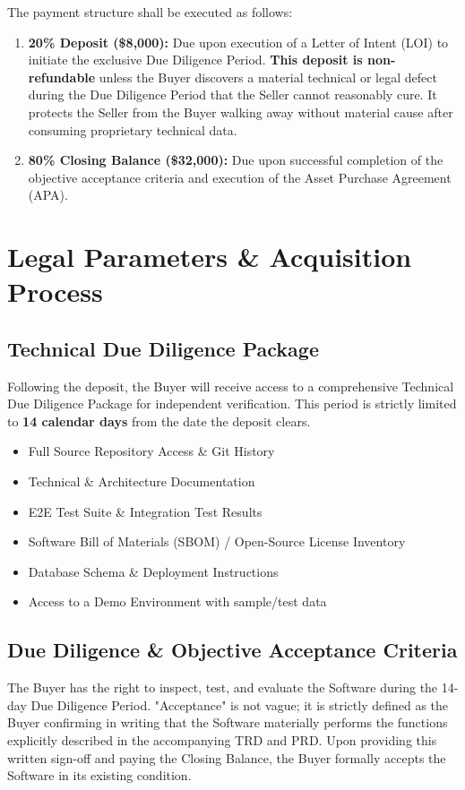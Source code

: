\documentclass[11pt,a4paper]{report}
\begin{document}
The payment structure shall be executed as follows:
\begin{enumerate}
    \item \textbf{20\% Deposit (\$8,000):} Due upon execution of a Letter of Intent (LOI) to initiate the exclusive Due Diligence Period. \textbf{This deposit is non-refundable} unless the Buyer discovers a material technical or legal defect during the Due Diligence Period that the Seller cannot reasonably cure. It protects the Seller from the Buyer walking away without material cause after consuming proprietary technical data.
    \item \textbf{80\% Closing Balance (\$32,000):} Due upon successful completion of the objective acceptance criteria and execution of the Asset Purchase Agreement (APA).
\end{enumerate}

\chapter{Legal Parameters \& Acquisition Process}

\section{Technical Due Diligence Package}
Following the deposit, the Buyer will receive access to a comprehensive Technical Due Diligence Package for independent verification. This period is strictly limited to \textbf{14 calendar days} from the date the deposit clears.
\begin{itemize}
    \item Full Source Repository Access \& Git History
    \item Technical \& Architecture Documentation
    \item E2E Test Suite \& Integration Test Results
    \item Software Bill of Materials (SBOM) / Open-Source License Inventory
    \item Database Schema \& Deployment Instructions
    \item Access to a Demo Environment with sample/test data
\end{itemize}

\section{Due Diligence \& Objective Acceptance Criteria}
The Buyer has the right to inspect, test, and evaluate the Software during the 14-day Due Diligence Period. "Acceptance" is not vague; it is strictly defined as the Buyer confirming in writing that the Software materially performs the functions explicitly described in the accompanying TRD and PRD. Upon providing this written sign-off and paying the Closing Balance, the Buyer formally accepts the Software in its existing condition.
\end{document}
